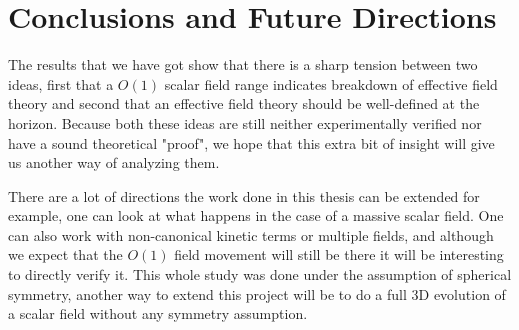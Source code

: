\chapter{Conclusions and Future Directions}

The results that we have got show that there is a sharp tension between two ideas, first that a $O(1)$ scalar field range indicates breakdown of effective field theory and second that an effective field theory should be well-defined at the horizon. Because both these ideas are still neither experimentally verified nor have a sound theoretical "proof", we hope that this extra bit of insight will give us another way of analyzing them.

There are a lot of directions the work done in this thesis can be extended for example, one can look at what happens in the case of a massive scalar field. One can also work with non-canonical kinetic terms or multiple fields, and although we expect that the $O(1)$ field movement will still be there it will be interesting to directly verify it.
This whole study was done under the assumption of spherical symmetry, another way to extend this project will be to do a full 3D evolution of a scalar field without any symmetry assumption.